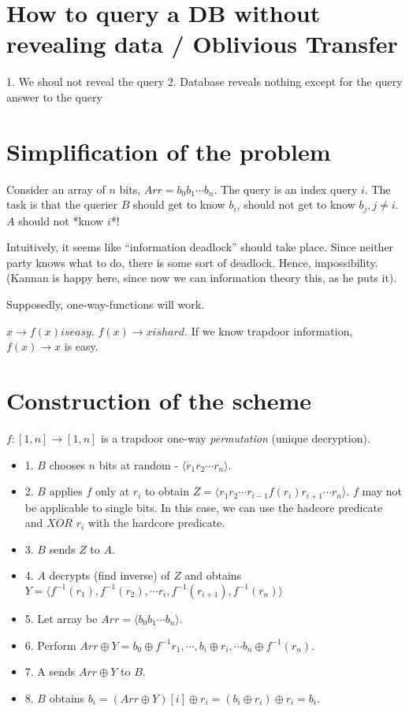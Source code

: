 \section{How to query a DB without revealing data / Oblivious Transfer}

1. We shoul not reveal the query
2. Database reveals nothing except for the query answer to the query


\section{Simplification of the problem}
Consider an array of $n$ bits, $Arr = b_0 b_1 \cdots b_n$. The query is an index query $i$.
The task is that the querier $B$ should get to know $b_i$, should not get to know
$b_j, j \neq i$. $A$ should not *know $i$*!

Intuitively, it seems like ``information deadlock'' should take place. Since neither
party knows what to do, there is some sort of deadlock. Hence, impossibility. (Kannan
is happy here, since now we can information theory this, as he puts it).

Supposedly, one-way-functions will work.

$x \rightarrow f(x) is easy$.
$f(x) \rightarrow x is hard$. If we know trapdoor information,
$f(x) \rightarrow x$ is easy.

\section{Construction of the scheme}

$f: [1, n] \to [1, n]$ is a trapdoor one-way \emph{permutation} (unique decryption).

\begin{itemize}
\item 1. $B$ chooses $n$ bits at random - $\langle r_1 r_2 \cdots r_n \rangle$.
\item 2. $B$ applies $f$ only at $r_i$ to obtain $Z = \langle r_1 r_2 \cdots r_{i -1} f(r_i) r_{i + 1} \cdots r_n \rangle$.
  $f$ may not be applicable to single bits. In this case, we can use the hadcore predicate and $XOR$ $r_i$ with the
  hardcore predicate.
\item 3. $B$ sends $Z$ to $A$.
\item 4. $A$ decrypts (find inverse) of $Z$ and obtains $Y = \langle f^{-1}(r_1), f^{-1}(r_2), \cdots r_i, f^{-1}(r_{i + 1}), f^{-1}(r_n) \rangle$
\item 5. Let array be $Arr = \langle b_0 b_1 \cdots b_n \rangle$.
\item 6. Perform $Arr \oplus Y = b_0 \oplus f^{-1}r_1, \cdots , b_{i} \oplus r_i, \cdots b_n \oplus f^{-1}(r_n)$.
\item 7. A sends $Arr \oplus Y$ to $B$.
\item 8. $B$ obtains $b_i = (Arr \oplus Y)[i] \oplus r_i = (b_{i} \oplus r_i) \oplus r_i = b_i$.
\end{itemize}

